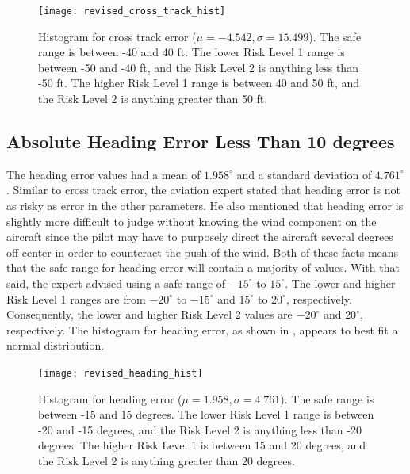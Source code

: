 		\begin{figure}
			\centering
            \texttt{[image: revised\_cross\_track\_hist]}
            \caption{Histogram for cross track error ($\mu = -4.542, \sigma = 15.499$).  The safe range is between -40 and 40 ft.  The lower Risk Level 1 range is between -50 and -40 ft, and the Risk Level 2 is anything less than -50 ft.  The higher Risk Level 1 range is between 40 and 50 ft, and the Risk Level 2 is anything greater than 50 ft.}
            \label{fig:revised_cross_track_hist}
		\end{figure}



    \subsection{Absolute Heading Error Less Than 10 degrees}
    
    	The heading error values had a mean of $1.958^\circ$ and a standard deviation of $4.761^\circ$.  Similar to cross track error, the aviation expert stated that heading error is not as risky as error in the other parameters.  He also mentioned that heading error is slightly more difficult to judge without knowing the wind component on the aircraft since the pilot may have to purposely direct the aircraft several degrees off-center in order to counteract the push of the wind.  Both of these facts means that the safe range for heading error will contain a majority of values.  With that said, the expert advised using a safe range of $-15^\circ$ to $15^\circ$.  The lower and higher Risk Level 1 ranges are from $-20^\circ$ to $-15^\circ$ and $15^\circ$ to $20^\circ$, respectively.  Consequently, the lower and higher Risk Level 2 values are $-20^\circ$ and $20^\circ$, respectively.  The histogram for heading error, as shown in , appears to best fit a normal distribution.
        
        \begin{figure}
			\centering
            \texttt{[image: revised\_heading\_hist]}
            \caption{Histogram for heading error ($\mu = 1.958, \sigma = 4.761$).  The safe range is between -15 and 15 degrees.  The lower Risk Level 1 range is between -20 and -15 degrees, and the Risk Level 2 is anything less than -20 degrees.  The higher Risk Level 1 is between 15 and 20 degrees, and the Risk Level 2 is anything greater than 20 degrees.}
            \label{fig:revised_heading_hist}
		\end{figure}
        

